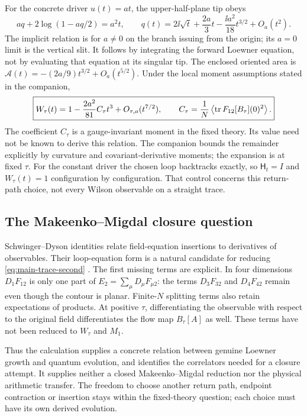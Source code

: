 For the concrete driver $u(t)=a t$, the upper-half-plane tip obeys
\begin{equation}\label{eq:main-linear-trace}
 aq+2\log(1-aq/2)=a^2t,\qquad
 q(t)=2\ii\sqrt t+\frac{2a}{3}t-\frac{\ii a^2}{18}t^{3/2}
                       +O_a(t^2).
\end{equation}
The implicit relation is for $a\ne0$ on the branch issuing from
the origin; its $a=0$ limit is the vertical slit. It follows by
integrating the forward Loewner equation, not by evaluating that
equation at its singular tip. The enclosed oriented area is
$\mathcal A(t)=-(2a/9)t^{3/2}+O_a(t^{5/2})$. Under the local
moment assumptions stated in the companion,
\begin{equation}\label{eq:main-trace-short-time}
 \boxed{W_\tau(t)=1-\frac{2a^2}{81}C_\tau t^3
                         +O_{\tau,a}(t^{7/2}),\qquad
 C_\tau=\frac1N\left\langle\operatorname{tr} F_{12}[B_\tau](0)^2\right\rangle.}
\end{equation}
The coefficient $C_\tau$ is a gauge-invariant moment in the fixed
theory. Its value need not be known to derive this relation.
The companion bounds the remainder explicitly by curvature and
covariant-derivative moments; the expansion is at fixed $\tau$.
For the constant driver the chosen loop backtracks exactly,
so $\mathsf H_t=I$ and $W_\tau(t)=1$ configuration by configuration.
That control concerns this return-path choice, not every Wilson
observable on a straight trace.

\subsection{The Makeenko--Migdal closure question}

Schwinger--Dyson identities relate field-equation insertions to
derivatives of observables. Their loop-equation form is a natural
candidate for reducing \eqref{eq:main-trace-second}
\cite{MakeenkoLoops}. The first missing terms are explicit. In
four dimensions $D_1F_{12}$ is only one part of
$E_2=\sum_\mu D_\mu F_{\mu2}$: the terms $D_3F_{32}$ and
$D_4F_{42}$ remain even though the contour is planar. Finite-$N$
splitting terms also retain expectations of products. At positive
$\tau$, differentiating the observable with respect to the
original field differentiates the flow map $B_\tau[A]$ as well.
These terms have not been reduced to $W_\tau$ and $M_1$.

Thus the calculation supplies a concrete relation between genuine
Loewner growth and quantum evolution, and identifies the
correlators needed for a closure attempt. It supplies neither a
closed Makeenko--Migdal reduction nor the physical arithmetic
transfer. The freedom to choose another return path, endpoint
contraction or insertion stays within the fixed-theory question;
each choice must have its own derived evolution.
